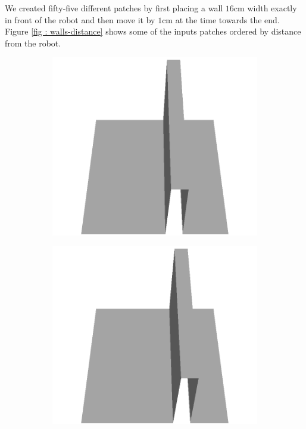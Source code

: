 We created fifty-five different patches by first placing a wall $16$cm width exactly in front of the robot and then move it by $1$cm at the time towards the end. Figure \ref{fig : walls-distance} shows some of the inputs patches ordered by distance from the robot. 
\begin{figure}[htbp]
    \centering
    \begin{subfigure}[b]{0.24\linewidth}
    \includegraphics[width=\linewidth]{../img/5/custom_patches/walls_front/all/00-3d.png}
    \end{subfigure}
    \begin{subfigure}[b]{0.24\linewidth}
    \includegraphics[width=\linewidth]{../img/5/custom_patches/walls_front/all/04-3d.png}

\end{subfigure}
\end{figure}
